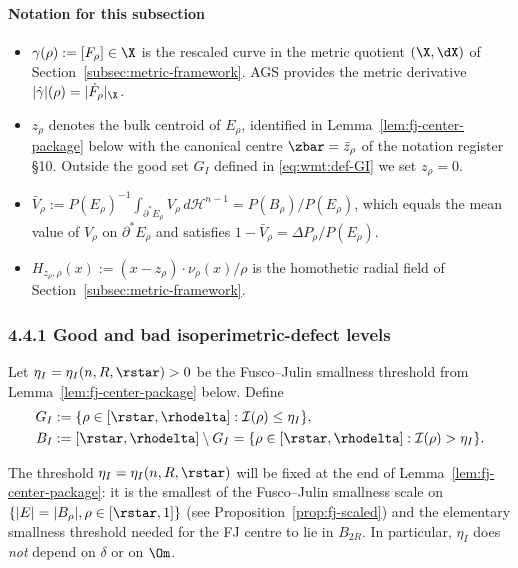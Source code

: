 \paragraph{Notation for this subsection}

\begin{itemize}
\item $\gamma(\rho):=[F_\rho]\in\X$ is the rescaled curve in the metric
      quotient $(\X,\dX)$ of Section~\ref{subsec:metric-framework}.
      AGS \cite[Thm.~1.1.2]{AGS2008} provides the metric derivative
      $|\dot\gamma|(\rho)=|\dot F_\rho|_{\X}$.
\item $z_\rho$ denotes the bulk centroid of $E_\rho$, identified in
      Lemma~\ref{lem:fj-center-package} below with the canonical centre
      $\zbar=\bar z_\rho$ of the notation register \S10. Outside the
      good set $G_I$ defined in \eqref{eq:wmt:def-GI} we set
      $z_\rho=0$.
\item $\bar V_\rho:=P(E_\rho)^{-1}\int_{\partial^*E_\rho}V_\rho\,
      d\mathcal H^{n-1}=P(B_\rho)/P(E_\rho)$, which equals
      the mean value of $V_\rho$ on $\partial^*E_\rho$ and satisfies
      $1-\bar V_\rho=\Delta P_\rho/P(E_\rho)$.
\item $H_{z_\rho,\rho}(x):=(x-z_\rho)\cdot\nu_\rho(x)/\rho$ is the
      homothetic radial field of Section~\ref{subsec:metric-framework}.
\end{itemize}

\subsubsection{4.4.1 Good and bad isoperimetric-defect levels}
\label{subsec:wmt:good-bad}

\begin{definition}
\label{def:wmt:GI-BI}
Let $\eta_I=\eta_I(n,R,\rstar)>0$ be the Fusco--Julin smallness
threshold from Lemma~\ref{lem:fj-center-package} below. Define
\begin{align}
   G_I &:= \{\rho\in[\rstar,\rhodelta]:\mathcal I(\rho)\le\eta_I\},
       \label{eq:wmt:def-GI}\\
   B_I &:= [\rstar,\rhodelta]\setminus G_I
       =\{\rho\in[\rstar,\rhodelta]:\mathcal I(\rho)>\eta_I\}.
       \label{eq:wmt:def-BI}
\end{align}
\end{definition}

The threshold $\eta_I=\eta_I(n,R,\rstar)$ will be fixed at the end of
Lemma~\ref{lem:fj-center-package}: it is the smallest of the
Fusco--Julin smallness scale on $\{|E|=|B_\rho|,\rho\in[\rstar,1]\}$ (see
Proposition~\ref{prop:fj-scaled}) and the elementary smallness
threshold needed for the FJ centre to lie in $B_{2R}$. In particular,
$\eta_I$ does \emph{not} depend on $\delta$ or on $\Om$.

